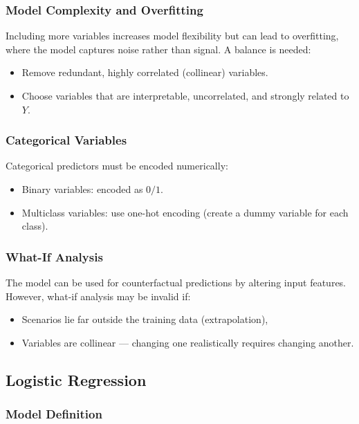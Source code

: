 \documentclass[9pt]{extarticle}
\begin{document}
\subsubsection*{Model Complexity and Overfitting}

Including more variables increases model flexibility but can lead to overfitting, 
where the model captures noise rather than signal. A balance is needed:
\begin{itemize}
    \item Remove redundant, highly correlated (collinear) variables.
    \item Choose variables that are interpretable, uncorrelated, and strongly related to $Y$.
\end{itemize}

\subsubsection*{Categorical Variables}

Categorical predictors must be encoded numerically:
\begin{itemize}
    \item Binary variables: encoded as $0/1$.
    \item Multiclass variables: use one-hot encoding (create a dummy variable for each class).
\end{itemize}

\subsubsection*{What-If Analysis}

The model can be used for counterfactual predictions by altering input features. However, what-if analysis may be invalid if:
\begin{itemize}
    \item Scenarios lie far outside the training data (extrapolation),
    \item Variables are collinear — changing one realistically requires changing another.
\end{itemize}

\subsection{Logistic Regression}

\subsubsection*{Model Definition}
\end{document}

